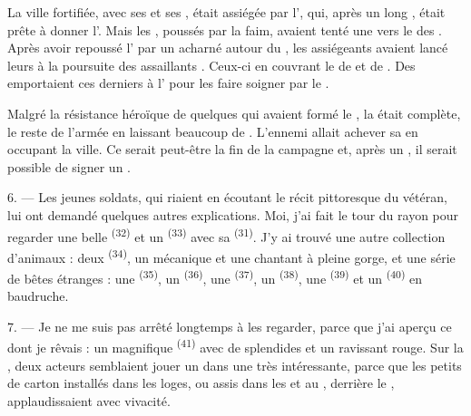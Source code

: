 La ville fortifiée, avec ses  et ses , était
assiégée par l', qui, après un long
, était prête à donner l'. Mais les
, poussés par la faim, avaient tenté une  vers
le  des . Après avoir repoussé l'
par un  acharné autour du , les assiégeants
 avaient lancé leurs  à la poursuite des
assaillants . Ceux-ci  en couvrant
le  de  et de . Des
 emportaient ces derniers à l' pour les
faire soigner par le .

Malgré la résistance héroïque de quelques  qui avaient formé
le , la  était complète, le reste de l'armée
 en laissant beaucoup de . L'ennemi allait
achever sa  en occupant la ville. Ce serait peut-être la fin de
la campagne et, après un , il serait possible de signer un
.

\VUsaut{4.4mm}
\VUsaut{2.8mm}

6. --- Les jeunes soldats, qui riaient en écoutant le récit pittoresque du
vétéran, lui ont demandé quelques autres explications. Moi, j'ai fait le tour du
rayon pour regarder une belle  \textsuperscript{(32)} et un
 \textsuperscript{(33)} avec sa 
\textsuperscript{(31)}. J'y ai trouvé une autre collection d'animaux : deux
 \textsuperscript{(34)}, un 
mécanique et une  chantant à pleine gorge, et une série de
bêtes étranges : une  \textsuperscript{(35)}, un
 \textsuperscript{(36)}, une  \textsuperscript{(37)},
un  \textsuperscript{(38)}, une 
\textsuperscript{(39)} et un  \textsuperscript{(40)} en baudruche.

7. --- Je ne me suis pas arrêté longtemps à les regarder, parce que j'ai aperçu
ce dont je rêvais : un magnifique 
\textsuperscript{(41)} avec de splendides  et un ravissant
 rouge. Sur la , deux acteurs semblaient jouer un
 dans une  très intéressante, parce que les petits
 de carton installés dans les loges, ou assis dans les
 et au , derrière le , applaudissaient avec vivacité.

